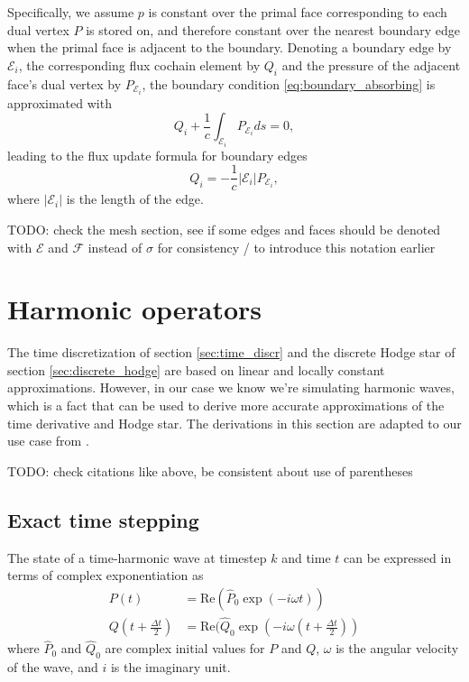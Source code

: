 \documentclass[utf8,english]{gradu3}
\begin{document}
Specifically, we assume $p$ is constant over the primal face corresponding
to each dual vertex $P$ is stored on,
and therefore constant over the nearest boundary edge
when the primal face is adjacent to the boundary.
Denoting a boundary edge by $\mathcal{E}_i$,
the corresponding flux cochain element by $Q_i$
and the pressure of the adjacent face's dual vertex by $P_{\mathcal{E}_i}$,
the boundary condition \eqref{eq:boundary_absorbing} is approximated with
\[
  Q_i + \frac{1}{c} \int_{\mathcal{E}_i} P_{\mathcal{E}_i} ds = 0,
\]
leading to the flux update formula for boundary edges
\begin{equation}
  Q_i = -\frac{1}{c} |\mathcal{E}_i| P_{\mathcal{E}_i},
\end{equation}
where $|\mathcal{E}_i|$ is the length of the edge.

TODO: check the mesh section, see if some edges and faces
should be denoted with $\mathcal{E}$ and $\mathcal{F}$ instead of $\sigma$
for consistency / to introduce this notation earlier

\section{Harmonic operators}\label{sec:harmonic_operators}

The time discretization of section \ref{sec:time_discr}
and the discrete Hodge star of section \ref{sec:discrete_hodge}
are based on linear and locally constant approximations.
However, in our case we know we're simulating harmonic waves,
which is a fact that can be used to derive more accurate approximations
of the time derivative and Hodge star.
The derivations in this section are adapted to our use case
from \parencite{rabina_numerical_2014}.

TODO: check citations like above, be consistent about use of parentheses


\subsection{Exact time stepping}

The state of a time-harmonic wave at timestep $k$ and time $t$
can be expressed in terms of complex exponentiation as
\begin{align}
\label{eq:harmonic_pressure}
P(t) &= \text{Re}(\hat{P}_0 \exp(-i\omega t)) \\
\label{eq:harmonic_flux}
Q(t + \frac{\Delta t}{2}) &= \text{Re}(\hat{Q}_0 \exp(-i\omega (t + \frac{\Delta t}{2}))
\end{align}
where $\hat{P}_0$ and $\hat{Q}_0$ are complex initial values for $P$ and $Q$,
$\omega$ is the angular velocity of the wave, and $i$ is the imaginary unit.
\end{document}
